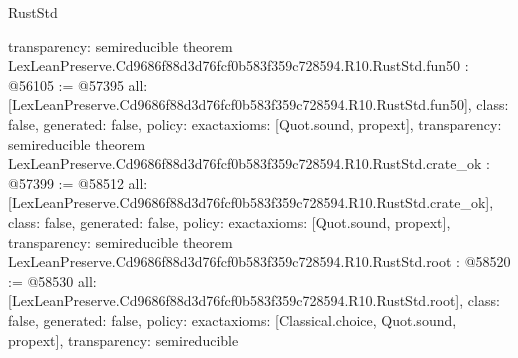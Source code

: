 \begin{lexlean}{RustStd}
\begin{coremodule}
{  transparency: semireducible
}
theorem LexLeanPreserve.Cd9686f88d3d76fcf0b583f359c728594.R10.RustStd.fun50 : @56105 := @57395 {
  all: [LexLeanPreserve.Cd9686f88d3d76fcf0b583f359c728594.R10.RustStd.fun50],
  class: false,
  generated: false,
  policy: exact{axioms: [Quot.sound, propext]},
  transparency: semireducible
}
theorem LexLeanPreserve.Cd9686f88d3d76fcf0b583f359c728594.R10.RustStd.crate_ok : @57399 := @58512 {
  all: [LexLeanPreserve.Cd9686f88d3d76fcf0b583f359c728594.R10.RustStd.crate_ok],
  class: false,
  generated: false,
  policy: exact{axioms: [Quot.sound, propext]},
  transparency: semireducible
}
theorem LexLeanPreserve.Cd9686f88d3d76fcf0b583f359c728594.R10.RustStd.root : @58520 := @58530 {
  all: [LexLeanPreserve.Cd9686f88d3d76fcf0b583f359c728594.R10.RustStd.root],
  class: false,
  generated: false,
  policy: exact{axioms: [Classical.choice, Quot.sound, propext]},
  transparency: semireducible
}


\end{coremodule}
\end{lexlean}
